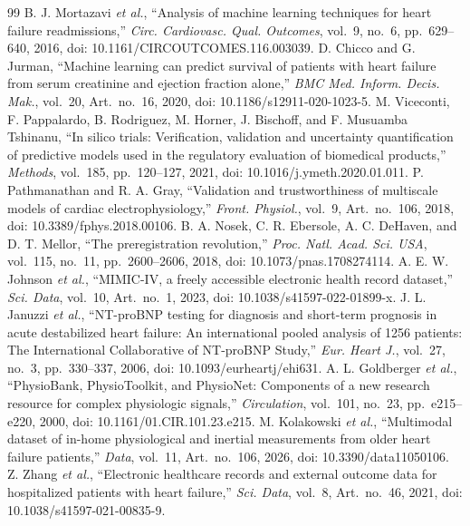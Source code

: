 \documentclass[conference]{IEEEtran}
\begin{document}
\begin{thebibliography}{99}
 B. J. Mortazavi \textit{et al.}, ``Analysis of machine learning techniques for heart failure readmissions,'' \textit{Circ. Cardiovasc. Qual. Outcomes}, vol.~9, no.~6, pp.~629--640, 2016, doi: 10.1161/CIRCOUTCOMES.116.003039.
 D. Chicco and G. Jurman, ``Machine learning can predict survival of patients with heart failure from serum creatinine and ejection fraction alone,'' \textit{BMC Med. Inform. Decis. Mak.}, vol.~20, Art.~no.~16, 2020, doi: 10.1186/s12911-020-1023-5.
 M. Viceconti, F. Pappalardo, B. Rodriguez, M. Horner, J. Bischoff, and F. Musuamba Tshinanu, ``In silico trials: Verification, validation and uncertainty quantification of predictive models used in the regulatory evaluation of biomedical products,'' \textit{Methods}, vol.~185, pp.~120--127, 2021, doi: 10.1016/j.ymeth.2020.01.011.
 P. Pathmanathan and R. A. Gray, ``Validation and trustworthiness of multiscale models of cardiac electrophysiology,'' \textit{Front. Physiol.}, vol.~9, Art.~no.~106, 2018, doi: 10.3389/fphys.2018.00106.
 B. A. Nosek, C. R. Ebersole, A. C. DeHaven, and D. T. Mellor, ``The preregistration revolution,'' \textit{Proc. Natl. Acad. Sci. USA}, vol.~115, no.~11, pp.~2600--2606, 2018, doi: 10.1073/pnas.1708274114.
 A. E. W. Johnson \textit{et al.}, ``MIMIC-IV, a freely accessible electronic health record dataset,'' \textit{Sci. Data}, vol.~10, Art.~no.~1, 2023, doi: 10.1038/s41597-022-01899-x.
 J. L. Januzzi \textit{et al.}, ``NT-proBNP testing for diagnosis and short-term prognosis in acute destabilized heart failure: An international pooled analysis of 1256 patients: The International Collaborative of NT-proBNP Study,'' \textit{Eur. Heart J.}, vol.~27, no.~3, pp.~330--337, 2006, doi: 10.1093/eurheartj/ehi631.
 A. L. Goldberger \textit{et al.}, ``PhysioBank, PhysioToolkit, and PhysioNet: Components of a new research resource for complex physiologic signals,'' \textit{Circulation}, vol.~101, no.~23, pp.~e215--e220, 2000, doi: 10.1161/01.CIR.101.23.e215.
 M. Kolakowski \textit{et al.}, ``Multimodal dataset of in-home physiological and inertial measurements from older heart failure patients,'' \textit{Data}, vol.~11, Art.~no.~106, 2026, doi: 10.3390/data11050106.
 Z. Zhang \textit{et al.}, ``Electronic healthcare records and external outcome data for hospitalized patients with heart failure,'' \textit{Sci. Data}, vol.~8, Art.~no.~46, 2021, doi: 10.1038/s41597-021-00835-9.

\end{thebibliography}
\end{document}
